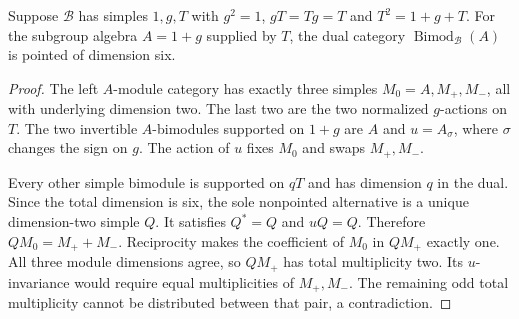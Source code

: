 \documentclass[11pt]{article}
\begin{document}
\begin{lemma}\label{lem:s3}
Suppose $\mathcal B$ has simples $1,g,T$ with
$g^2=1$, $gT=Tg=T$ and $T^2=1+g+T$. For the subgroup algebra $A=1+g$
supplied by $T$, the dual category $\operatorname{Bimod}_{\mathcal B}(A)$ is pointed
of dimension six.
\end{lemma}
\begin{proof}
The left $A$-module category has exactly three simples $M_0=A,M_+,M_-$, all with
underlying dimension two. The last two are the two normalized $g$-actions on $T$.
The two invertible $A$-bimodules supported on $1+g$ are $A$ and $u=A_\sigma$, where
$\sigma$ changes the sign on $g$. The action of $u$ fixes $M_0$ and swaps $M_+,M_-$.

Every other simple bimodule is supported on $qT$ and has dimension $q$ in the dual.
Since the total dimension is six, the sole nonpointed alternative is a unique
dimension-two simple $Q$. It satisfies $Q^*=Q$ and $uQ=Q$. Therefore
$QM_0=M_++M_-$. Reciprocity makes the coefficient of $M_0$ in $QM_+$ exactly one.
All three module dimensions agree, so $QM_+$ has total multiplicity two. Its
$u$-invariance would require equal multiplicities of $M_+,M_-$. The remaining
odd total multiplicity cannot be distributed between that pair, a contradiction.
\end{proof}
\end{document}
